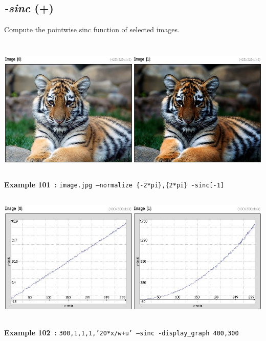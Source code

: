 \documentclass[a4paper,11pt,twoside]{book}
\begin{document}
\subsection{\emph{-sinc} (+)}\vspace*{-0.5em}
Compute the pointwise sinc function of selected images.
\begin{center}\includegraphics[keepaspectratio=true,height=7cm,width=\textwidth]{img/gmic_def101.jpg}\\
{\footnotesize \textbf{Example 101~:} \texttt{image.jpg --normalize \{-2*pi\},\{2*pi\} -sinc[-1]}}
\\\includegraphics[keepaspectratio=true,height=7cm,width=\textwidth]{img/gmic_def102.jpg}\\
{\footnotesize \textbf{Example 102~:} \texttt{300,1,1,1,'20*x/w+u' --sinc -display\_graph 400,300}}
\end{center}
\end{document}
